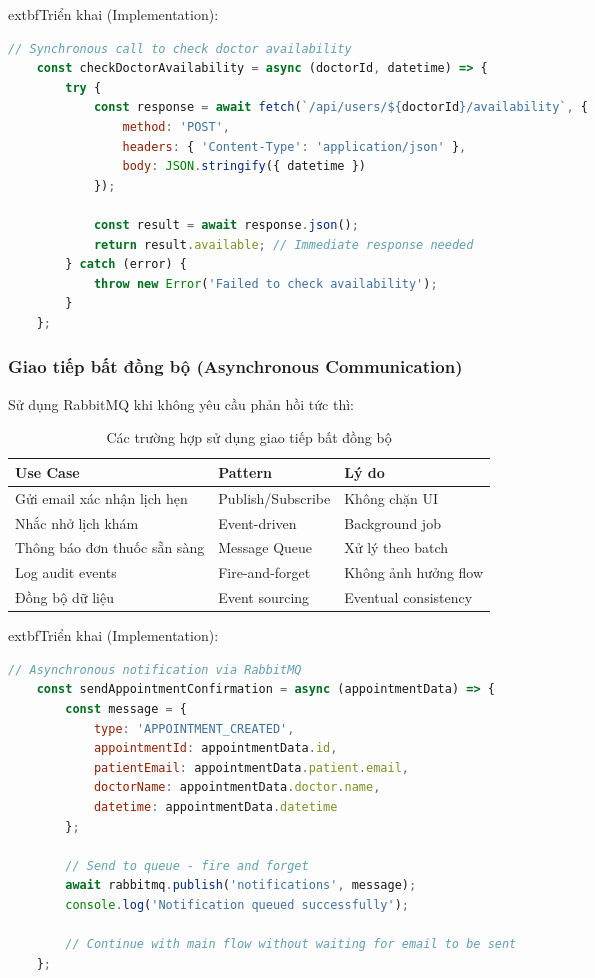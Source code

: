 \documentclass[12pt,a4paper]{report}
\begin{document}
        extbf{Triển khai (Implementation)}:
    \begin{lstlisting}[language=JavaScript, caption=HTTP REST API call example]
    // Synchronous call to check doctor availability
    const checkDoctorAvailability = async (doctorId, datetime) => {
        try {
            const response = await fetch(`/api/users/${doctorId}/availability`, {
                method: 'POST',
                headers: { 'Content-Type': 'application/json' },
                body: JSON.stringify({ datetime })
            });
            
            const result = await response.json();
            return result.available; // Immediate response needed
        } catch (error) {
            throw new Error('Failed to check availability');
        }
    };
    \end{lstlisting}

    \subsubsection{Giao tiếp bất đồng bộ (Asynchronous Communication)}
    Sử dụng RabbitMQ khi không yêu cầu phản hồi tức thì:

    \begin{table}[h]
    \centering
    \caption{Các trường hợp sử dụng giao tiếp bất đồng bộ}
    \begin{tabular}{|l|l|l|}
    \hline
    \textbf{Use Case} & \textbf{Pattern} & \textbf{Lý do} \\
    \hline
    Gửi email xác nhận lịch hẹn & Publish/Subscribe & Không chặn UI \\
    \hline
    Nhắc nhở lịch khám & Event-driven & Background job \\
    \hline
    Thông báo đơn thuốc sẵn sàng & Message Queue & Xử lý theo batch \\
    \hline
    Log audit events & Fire-and-forget & Không ảnh hưởng flow \\
    \hline
    Đồng bộ dữ liệu & Event sourcing & Eventual consistency \\
    \hline
    \end{tabular}
    \end{table}

        extbf{Triển khai (Implementation)}:
    \begin{lstlisting}[language=JavaScript, caption=RabbitMQ publisher example]
    // Asynchronous notification via RabbitMQ
    const sendAppointmentConfirmation = async (appointmentData) => {
        const message = {
            type: 'APPOINTMENT_CREATED',
            appointmentId: appointmentData.id,
            patientEmail: appointmentData.patient.email,
            doctorName: appointmentData.doctor.name,
            datetime: appointmentData.datetime
        };
        
        // Send to queue - fire and forget
        await rabbitmq.publish('notifications', message);
        console.log('Notification queued successfully');
        
        // Continue with main flow without waiting for email to be sent
    };
    \end{lstlisting}
\end{document}
